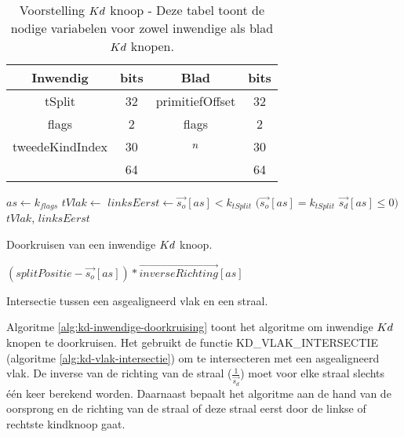 \begin{table}
    \centering
    \begin{tabular}{@{}|c|c|c|c|@{}} \toprule      
    Inwendig & bits & Blad & bits \\ \midrule
    tSplit & 32 & primitiefOffset & 32 \\
    flags  & 2  &  flags   & 2    \\
    tweedeKindIndex & 30 & $n$ & 30 \\ \hline \hline
    & 64 & & 64    \\ \bottomrule
    \end{tabular}
    \caption[Voorstelling $\symKd$ knoop]{Voorstelling $\symKd$ knoop - \small Deze tabel toont de nodige variabelen voor zowel inwendige als blad $\symKd$ knopen.}
    \label{tab:voorstelling-kd-knoop}
\end{table}            
\begin{dutchalgorithm}
    \begin{algorithmic}       
            \State $as \gets k_{flags}$
            \State $tVlak \gets $ 
            \State $linksEerst \gets \vec{s_o}[as] < k_{tSplit}$ \Or $(\vec{s_o}[as] = k_{tSplit}$ \And $\vec{s_d}[as] \leq 0)$
            \State \Return $tVlak$, $linksEerst$
        \EndFunction
    \end{algorithmic}
    \caption{Doorkruisen van een inwendige $\symKd$ knoop.}
    \label{alg:kd-inwendige-doorkruising}
\end{dutchalgorithm}
\begin{dutchalgorithm}
    \begin{algorithmic}       
            \State \Return $(splitPositie - \vec{s_o}[as]) * \vec{inverseRichting}[as]$
        \EndFunction
    \end{algorithmic}
    \caption{Intersectie tussen een asgealigneerd vlak en een straal.}
    \label{alg:kd-vlak-intersectie}
\end{dutchalgorithm}
Algoritme \ref{alg:kd-inwendige-doorkruising} toont het algoritme om inwendige $\symKd$ knopen te doorkruisen.
Het gebruikt de functie KD\_VLAK\_INTERSECTIE (algoritme \ref{alg:kd-vlak-intersectie}) om te intersecteren met een asgealigneerd vlak.
De inverse van de richting van de straal ($\frac{1}{\vec{s_d}}$) moet voor elke straal slechts één keer berekend worden.
Daarnaast bepaalt het algoritme aan de hand van de oorsprong en de richting van de straal of deze straal eerst door de linkse of rechtste kindknoop gaat.
\\


